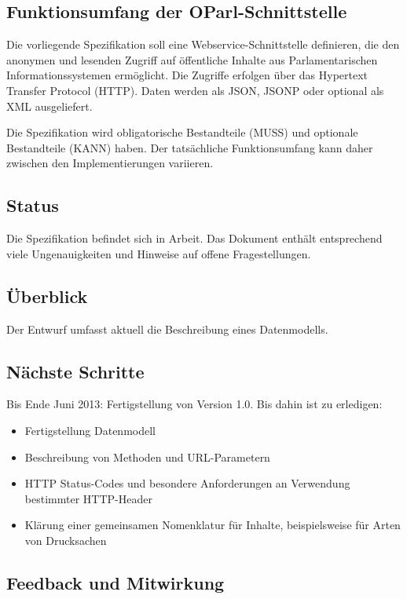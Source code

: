 \documentclass[,a4paper]{article}
\begin{document}
\subsection{Funktionsumfang der OParl-Schnittstelle}

Die vorliegende Spezifikation soll eine Webservice-Schnittstelle
definieren, die den anonymen und lesenden Zugriff auf öffentliche
Inhalte aus Parlamentarischen Informationssystemen ermöglicht. Die
Zugriffe erfolgen über das Hypertext Transfer Protocol (HTTP). Daten
werden als JSON, JSONP oder optional als XML ausgeliefert.

Die Spezifikation wird obligatorische Bestandteile (MUSS) und optionale
Bestandteile (KANN) haben. Der tatsächliche Funktionsumfang kann daher
zwischen den Implementierungen variieren.

\subsection{Status}

Die Spezifikation befindet sich in Arbeit. Das Dokument enthält
entsprechend viele Ungenauigkeiten und Hinweise auf offene
Fragestellungen.

\subsection{Überblick}

Der Entwurf umfasst aktuell die Beschreibung eines Datenmodells.

\subsection{Nächste Schritte}

Bis Ende Juni 2013: Fertigstellung von Version 1.0. Bis dahin ist zu
erledigen:

\begin{itemize}
\item
  Fertigstellung Datenmodell
\item
  Beschreibung von Methoden und URL-Parametern
\item
  HTTP Status-Codes und besondere Anforderungen an Verwendung bestimmter
  HTTP-Header
\item
  Klärung einer gemeinsamen Nomenklatur für Inhalte, beispielsweise für
  Arten von Drucksachen
\end{itemize}

\subsection{Feedback und Mitwirkung}
\end{document}
